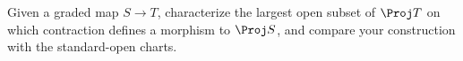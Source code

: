 \begin{problem}\label{chal:vi35-04}
Given a graded map \(S\to T\), characterize the largest open subset of \(\Proj T\) on which contraction defines a morphism to \(\Proj S\), and compare your construction with the standard-open charts.
\end{problem}
